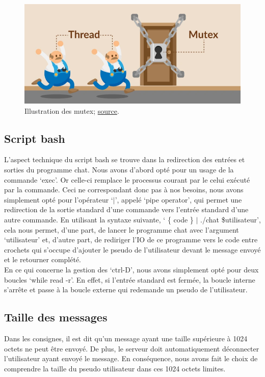 \documentclass[utf8]{article}
\begin{document}
\begin{figure}[h]
    \centering
    \includegraphics[scale=0.4]{mutex.png}
    \caption{Illustration des mutex; \href{https://codegym.cc/fr/groups/posts/fr.220.difference-entre-un-mutex-un-moniteur-et-un-semaphore}{source}.}
\end{figure}

\subsection{Script bash}
L'aspect technique du script bash se trouve dans la redirection des entrées et sorties du programme chat. Nous avons d'abord opté pour un usage de la commande `exec'. Or celle-ci remplace le processus courant
par le celui exécuté par la commande. Ceci ne correspondant donc pas à nos besoins, nous avons simplement opté pour l'opérateur `$|$', appelé `pipe operator', qui permet une redirection de la sortie standard d'une 
commande vers l'entrée standard d'une autre commande. En utilisant la syntaxe suivante, ` \{ code \} $|$ ./chat \$utilisateur', cela nous permet, d'une part, de lancer le programme chat avec l'argument `utilisateur' et,
d'autre part, de rediriger l'IO de ce programme vers le code entre crochets qui s'occupe d'ajouter le pseudo de l'utilisateur devant le message envoyé et le retourner complété. \\
En ce qui concerne la gestion des `ctrl-D', nous avons simplement opté pour deux boucles `while read -r'. En effet, si l'entrée standard est fermée, la boucle interne s'arrête et passe à la boucle externe qui
redemande un pseudo de l'utilisateur.

\subsection{Taille des messages}
Dans les consignes, il est dit qu'un message ayant une taille supérieure à 1024 octets ne peut être envoyé. De plus, le serveur doit automatiquement déconnecter l'utilisateur ayant envoyé le message. 
En conséquence, nous avons fait le choix de comprendre la taille du pseudo utilisateur dans ces 1024 octets limites.
\end{document}
